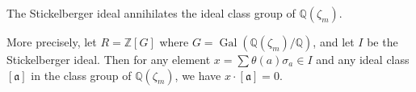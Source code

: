 The Stickelberger ideal annihilates the ideal class group of $\mathbb{Q}(\zeta_m)$.

More precisely, let $R = \mathbb{Z}[G]$ where $G = \operatorname{Gal}(\mathbb{Q}(\zeta_m)/\mathbb{Q})$, and let $I$ be the Stickelberger ideal. Then for any element $x = \sum \theta(a)\sigma_a \in I$ and any ideal class $[\mathfrak{a}]$ in the class group of $\mathbb{Q}(\zeta_m)$, we have $x \cdot [\mathfrak{a}] = 0$.
